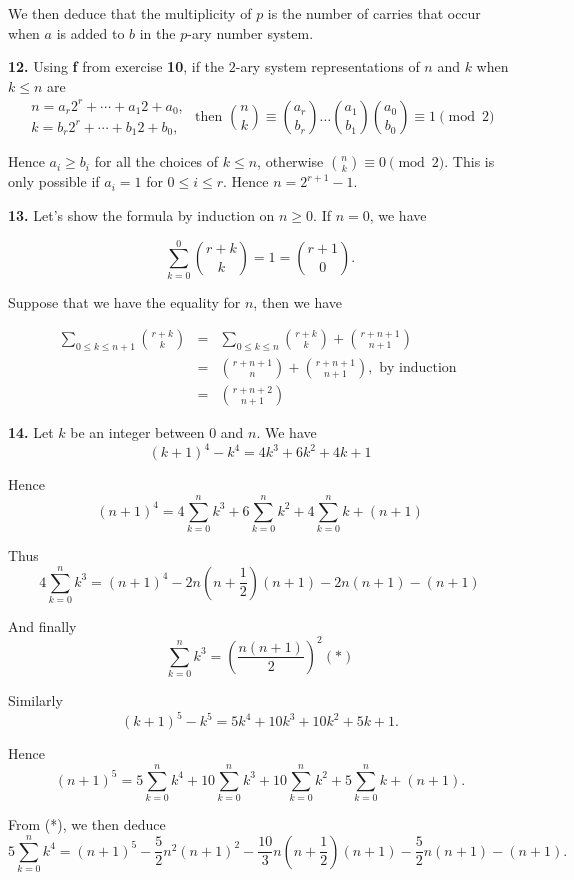 \documentclass[a4paper,12pt]{article}
\newcommand{\newpar}[1]{\bigskip \noindent \textbf{#1.}}
\begin{document}
We then deduce that the multiplicity of $p$ is the number of carries
that occur when $a$ is added to $b$ in the $p$-ary number system.

\newpar{12} Using \textbf{f} from exercise \textbf{10}, if the $2$-ary
system representations of $n$ and $k$ when $k \le n$ are
\[
\begin{array}{l}
  n = a_r 2^r + \cdots + a_1 2 + a_0, \\
  k = b_r 2^r + \cdots + b_1 2 + b_0,
\end{array}
\mbox{ then } {n \choose k} \equiv {{a_r} \choose {b_r}} \ldots {{a_1}
  \choose {b_1}}
{{a_0} \choose {b_0}} \equiv 1 \pmod 2
\]

Hence $a_i \ge b_i$ for all the choices of $k \le n$, otherwise ${n
  \choose k}
\equiv 0 \pmod 2$. This is only possible if $a_i = 1$ for $0 \le i \le
r$.  Hence $n = 2^{r+1}-1$.

\newpar{13} Let's show the formula by induction on $n \ge 0$.  If
$n=0$, we have

\[ \sum_{k=0}^0 {{r+k} \choose k} = 1 = {{r+1} \choose 0}.\]

Suppose that we have the equality for $n$, then we have

\begin{eqnarray*}
  \sum_{0\le k\le n+1}{{r+k} \choose k} &=& \sum_{0\le k \le n}{{r+k}
    \choose k} +
  {{r+n+1} \choose {n+1}} \\
  &=& {{r+n+1} \choose n} + {{r+n+1} \choose {n+1}}, \mbox{ by induction } \\
  &=& {{r+n+2} \choose {n+1}}
\end{eqnarray*}

\newpar{14} Let $k$ be an integer between $0$ and $n$.  We have
\[ (k+1)^4 - k^4 = 4 k^3 + 6 k^2 + 4 k + 1\]

Hence
\[ (n+1)^4 = 4 \sum_{k=0}^n k^3 + 6 \sum_{k=0}^n k^2 + 4 \sum_{k=0}^n k
+ (n+1)\]

Thus
\[ 4 \sum_{k=0}^n k^3 = (n+1)^4 - 2 n\left(n +
\frac{1}{2}\right)(n+1) - 2 n(n+1) - (n+1)\]

And finally
\[ \sum_{k=0}^n k^3 = \left( \frac{n(n+1)}{2} \right)^2 (*)\]

Similarly
\[ (k+1)^5 - k^5 = 5 k^4 + 10 k^3 + 10 k^2 + 5 k + 1.\]

Hence
\[ (n+1)^5 = 5 \sum_{k=0}^n k^4 + 10 \sum_{k=0}^n k^3 + 10
\sum_{k=0}^n k^2 + 5 \sum_{k=0}^n k + (n+1).\]

From (*), we then deduce
\[ 5 \sum_{k=0}^n k^4 = (n+1)^5 - \frac{5}{2} n^2(n+1)^2 -
\frac{10}{3}n\left(n+\frac{1}{2}\right) (n+1) -
\frac{5}{2}n(n+1)-(n+1).\]
\end{document}
